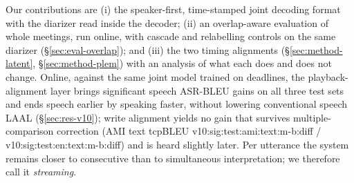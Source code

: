 Our contributions are (i) the speaker-first, time-stamped joint decoding format with the diarizer read inside the
decoder; (ii) an overlap-aware evaluation of whole meetings, run online, with cascade and relabelling controls on the same
diarizer (\S\ref{sec:eval-overlap}); and (iii) the two timing alignments (\S\ref{sec:method-latent},
\S\ref{sec:method-plem}) with an analysis of what each does and does not change. Online, against the same joint model
trained on deadlines, the playback-alignment layer brings significant speech ASR-BLEU gains on all three test sets
and ends speech earlier by speaking faster, without lowering conventional speech LAAL (\S\ref{sec:res-v10}); write alignment yields no gain that survives multiple-comparison correction (AMI text tcpBLEU
\num{v10:sig:test:ami:text:m-b:diff} / \num{v10:sig:test:en:text:m-b:diff}) and is heard slightly later. Per utterance
the system remains closer to consecutive than to simultaneous interpretation; we therefore call it \emph{streaming}.
